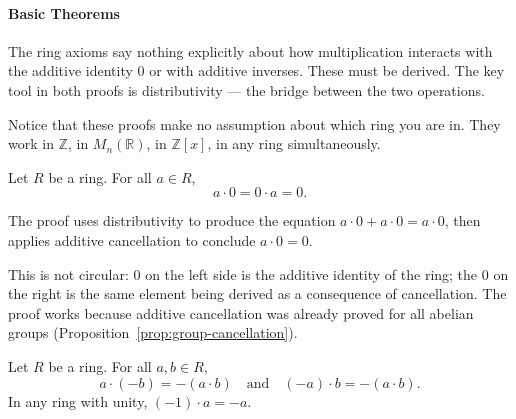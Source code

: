 \paragraph{Basic Theorems}

\begin{remark}
The ring axioms say nothing explicitly about how multiplication
interacts with the additive identity $0$ or with additive inverses.
These must be derived. The key tool in both proofs is distributivity
--- the bridge between the two operations.

Notice that these proofs make no assumption about which ring you are in.
They work in $\mathbb{Z}$, in $M_n(\mathbb{R})$, in $\mathbb{Z}[x]$,
in any ring simultaneously.
\end{remark}

\begin{proposition}
\label{prop:ring-mult-zero}
Let $R$ be a ring. For all $a \in R$,
\[
a \cdot 0 = 0 \cdot a = 0.
\]
\end{proposition}

\begin{remark*}[Flash]
\end{remark*}



\begin{remark}
The proof uses distributivity to produce the equation
$a \cdot 0 + a \cdot 0 = a \cdot 0$, then applies additive
cancellation to conclude $a \cdot 0 = 0$.

This is not circular: $0$ on the left side is the additive identity
of the ring; the $0$ on the right is the same element being derived
as a consequence of cancellation. The proof works because additive
cancellation was already proved for all abelian groups
(Proposition~\ref{prop:group-cancellation}).
\end{remark}

\begin{proposition}
\label{prop:ring-mult-neg}
Let $R$ be a ring. For all $a, b \in R$,
\[
a \cdot (-b) = -(a \cdot b)
\quad\text{and}\quad
(-a) \cdot b = -(a \cdot b).
\]
In any ring with unity, $(-1) \cdot a = -a$.
\end{proposition}

